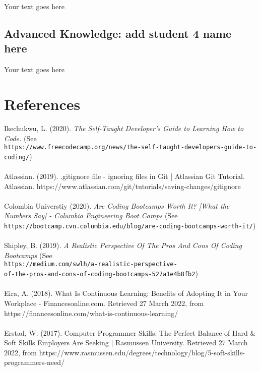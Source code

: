 \documentclass[a4paper, 11pt]{report}
\begin{document}
	Your text goes here
	
	\subsection{Advanced Knowledge: add student 4 name here}
	
	Your text goes here
	
	
	
	
	\newpage
	
	
	
	\section{References}
	Ikechukwu, L. (2020). \textit{The Self-Taught Developer's Guide to Learning How to Code.} (See\\ \texttt{https://www.freecodecamp.org/news/the-self-taught-developers-guide-to-coding/})
	\\
	\\
	Atlassian. (2019). .gitignore file - ignoring files in Git | Atlassian Git Tutorial. Atlassian. https://www.atlassian.com/git/tutorials/saving-changes/gitignore
	\\
	\\
	Colombia Universtiy (2020). \textit{Are Coding Bootcamps Worth It? [What the Numbers Say] - Columbia Engineering Boot Camps} (See\\ \texttt{https://bootcamp.cvn.columbia.edu/blog/are-coding-bootcamps-worth-it/}) 
	\\
	\\
	Shipley, B. (2019). \textit{A Realistic Perspective Of The Pros And Cons Of Coding Bootcamps} (See\\ \texttt{https://medium.com/swlh/a-realistic-perspective-\\
		of-the-pros-and-cons-of-coding-bootcamps-527a1e4b8fb2}) 
	\\
	\\
	Eira, A. (2018). What Is Continuous Learning: Benefits of Adopting It in Your Workplace - Financesonline.com. Retrieved 27 March 2022, from https://financesonline.com/what-is-continuous-learning/
	\\
	\\
	Erstad, W. (2017). Computer Programmer Skills: The Perfect Balance of Hard \& Soft Skills Employers Are Seeking | Rasmussen University. Retrieved 27 March 2022, from https://www.rasmussen.edu/degrees/technology/blog/5-soft-skills-programmers-need/
\end{document}
